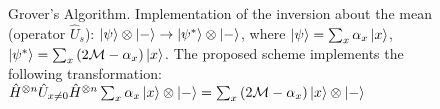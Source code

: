 \begin{figure}
\centering



\caption{Grover's Algorithm. Implementation of the inversion about
  the mean (operator $\hat{U}_s$): $\left|\psi\right>\otimes\ket{-} \rightarrow
  \left|\psi^{\ast}\right>\otimes\ket{-}$, where
$\left|\psi\right> = \sum_x \alpha_x \ket{ x }$, 
$\left|\psi^{\ast}\right> = \sum_x \left( 2 \mathcal{M} -  \alpha_x \right)
  \ket{ x }$. 
The proposed scheme implements the following transformation: 
$\hat{H}^{\otimes n}\hat{U}_{x \ne 0}\hat{H}^{\otimes n} \sum_x
  \alpha_x \ket{ x } \otimes \left| - \right > = 
\sum_x \left( 2 \mathcal{M} -  \alpha_x \right) \ket{ x }
\otimes \left| - \right >
$
} 
\label{figQuantCompGroverMeanInvImpl}
\end{figure}
